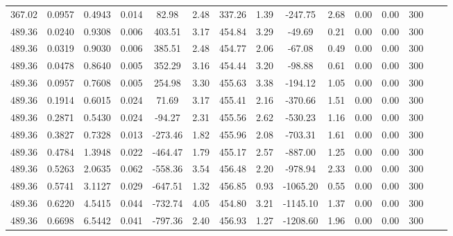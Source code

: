 \documentclass[%
 aip,
 jcp,
 sd,%
 amsmath,amssymb,
]{revtex4-1}
\begin{document}
\begin{table*}[!htbp]
\begin{ruledtabular}
\begin{tabular}{ccccccccccccccc}
367.02	&	0.0957	&	0.4943	&	0.014	&	82.98	&	2.48	&	337.26	&	1.39	&	-247.75	&	2.68	&	0.00	&	0.00	&	300	\\
489.36	&	0.0240	&	0.9308	&	0.006	&	403.51	&	3.17	&	454.84	&	3.29	&	-49.69	&	0.21	&	0.00	&	0.00	&	300	\\
489.36	&	0.0319	&	0.9030	&	0.006	&	385.51	&	2.48	&	454.77	&	2.06	&	-67.08	&	0.49	&	0.00	&	0.00	&	300	\\
489.36	&	0.0478	&	0.8640	&	0.005	&	352.29	&	3.16	&	454.44	&	3.20	&	-98.88	&	0.61	&	0.00	&	0.00	&	300	\\
489.36	&	0.0957	&	0.7608	&	0.005	&	254.98	&	3.30	&	455.63	&	3.38	&	-194.12	&	1.05	&	0.00	&	0.00	&	300	\\
489.36	&	0.1914	&	0.6015	&	0.024	&	71.69	&	3.17	&	455.41	&	2.16	&	-370.66	&	1.51	&	0.00	&	0.00	&	300	\\
489.36	&	0.2871	&	0.5430	&	0.024	&	-94.27	&	2.31	&	455.56	&	2.62	&	-530.23	&	1.16	&	0.00	&	0.00	&	300	\\
489.36	&	0.3827	&	0.7328	&	0.013	&	-273.46	&	1.82	&	455.96	&	2.08	&	-703.31	&	1.61	&	0.00	&	0.00	&	300	\\
489.36	&	0.4784	&	1.3948	&	0.022	&	-464.47	&	1.79	&	455.17	&	2.57	&	-887.00	&	1.25	&	0.00	&	0.00	&	300	\\
489.36	&	0.5263	&	2.0635	&	0.062	&	-558.36	&	3.54	&	456.48	&	2.20	&	-978.94	&	2.33	&	0.00	&	0.00	&	300	\\
489.36	&	0.5741	&	3.1127	&	0.029	&	-647.51	&	1.32	&	456.85	&	0.93	&	-1065.20	&	0.55	&	0.00	&	0.00	&	300	\\
489.36	&	0.6220	&	4.5415	&	0.044	&	-732.74	&	4.05	&	454.80	&	3.21	&	-1145.10	&	1.37	&	0.00	&	0.00	&	300	\\
489.36	&	0.6698	&	6.5442	&	0.041	&	-797.36	&	2.40	&	456.93	&	1.27	&	-1208.60	&	1.96	&	0.00	&	0.00	&	300	\\
\end{tabular}
\end{ruledtabular}
\end{table*}
\end{document}
